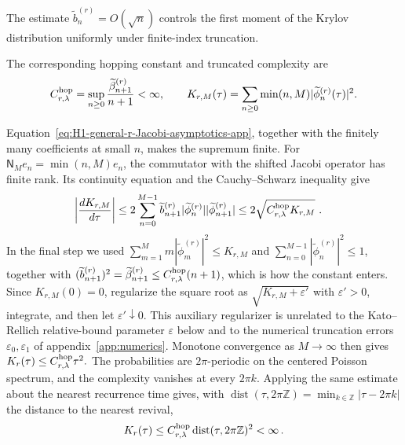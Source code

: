 \documentclass[a4paper,11pt]{article}
\def\dd{d}%
\theoremstyle{definition}
\theoremstyle{remark}
\newcommand{\dd}{\mathrm d}
\newcommand{\tphi}{\widetilde\phi}
\begin{document}
The estimate \(\widetilde b_n^{(r)}=O(\sqrt n)\) controls
the first moment of the Krylov distribution uniformly under
finite-index truncation.
\begin{samepage}
\noindent The corresponding hopping constant and truncated complexity are
\begin{equation}
   C_{r,\lambda}^{\rm hop}
   =
   \sup_{n\ge0}
   \frac{\widetilde\beta_{n+1}^{(r)}}{n+1}<\infty,\qquad
   K_{r,M}(\tau)
   =
   \sum_{n\ge0}\min(n,M)
   |\tphi_n^{(r)}(\tau)|^2.
   \label{eq:H1-truncated-complexity-app}
\end{equation}
\end{samepage}
Equation~\eqref{eq:H1-general-r-Jacobi-asymptotics-app}, together with
the finitely many coefficients at small $n$, makes the supremum finite.
For $\mathsf N_Me_n=\min(n,M)e_n$, the commutator with the shifted
Jacobi operator has finite rank. Its continuity equation and the
Cauchy--Schwarz inequality give
\begin{equation}
\begin{aligned}
   \left|\frac{\dd K_{r,M}}{\dd\tau}\right|
   &\le
   2\sum_{n=0}^{M-1}
   \widetilde b_{n+1}^{(r)}
   |\tphi_n^{(r)}||\tphi_{n+1}^{(r)}|
   \le
   2\sqrt{C_{r,\lambda}^{\rm hop}K_{r,M}}\,\,.
\end{aligned}
   \label{eq:H1-truncated-complexity-current-bound-app}
\end{equation}
In the final step we used
\(\sum_{m=1}^{M}m|\tphi_m^{(r)}|^2\le K_{r,M}\) and
\(\sum_{n=0}^{M-1}|\tphi_n^{(r)}|^2\le1\), together with
\((\widetilde b_{n+1}^{(r)})^2=\widetilde\beta_{n+1}^{(r)}
\le C_{r,\lambda}^{\rm hop}(n+1)\), which is how the constant enters.
Since
\(K_{r,M}(0)=0\), regularize the square root as
\(\sqrt{K_{r,M}+\varepsilon'}\) with $\varepsilon'>0$, integrate, and then let
$\varepsilon'\downarrow0$.  This auxiliary regularizer is unrelated to the Kato--Rellich
relative-bound parameter $\varepsilon$ below and to the numerical truncation errors
$\varepsilon_0,\varepsilon_1$ of appendix~\ref{app:numerics}.  Monotone convergence as
$M\to\infty$ then gives
\(
   K_r(\tau)\le C_{r,\lambda}^{\rm hop}\tau^2.
\)
The probabilities are $2\pi$-periodic on the centered Poisson spectrum,
and the complexity vanishes at every $2\pi k$. Applying the same estimate
about the nearest recurrence time gives, with $\operatorname{dist}(\tau,2\pi\mathbb Z)=\min_{k\in\mathbb Z}|\tau-2\pi k|$ the distance to the nearest revival,
\begin{equation}
   K_r(\tau)
   \le
   C_{r,\lambda}^{\rm hop}
   \operatorname{dist}(\tau,2\pi\mathbb Z)^2
   <\infty\,.
   \label{eq:H1-general-r-complexity-bound-app}
\end{equation}
\end{document}
